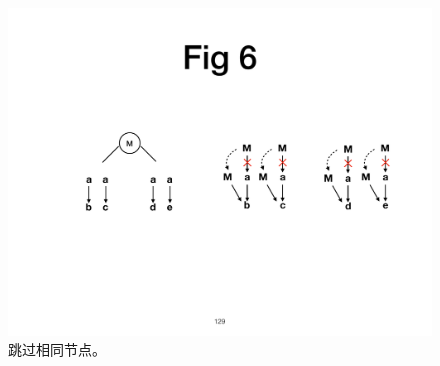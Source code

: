 
\begin{figure}[!htbp]
\centering
      \centering\includegraphics[width=\linewidth]{figures/ss-129.pdf}
\caption{\small 跳过相同节点。}
\label{fig:skip}
\end{figure}


